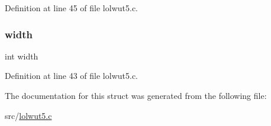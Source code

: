 Definition at line 45 of file lolwut5.\+c.

\mbox{\label{structlw_canvas_a2474a5474cbff19523a51eb1de01cda4}} 
\subsubsection{\texorpdfstring{width}{width}}
{\footnotesize\ttfamily int width}



Definition at line 43 of file lolwut5.\+c.



The documentation for this struct was generated from the following file\+:\begin{DoxyCompactItemize}
\item 
src/\hyperlink{lolwut5_8c}{lolwut5.\+c}\end{DoxyCompactItemize}
